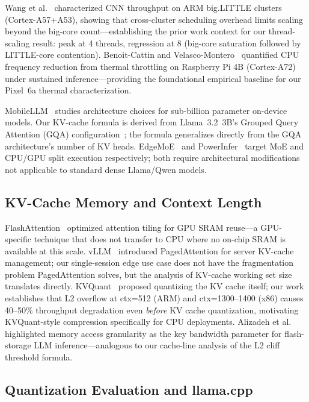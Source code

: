 \documentclass[conference]{IEEEtran}
\begin{document}
Wang et al.~\cite{wang_biglittle} characterized CNN throughput on ARM big.LITTLE
clusters (Cortex-A57+A53), showing that cross-cluster scheduling overhead limits
scaling beyond the big-core count---establishing the prior work context for our
thread-scaling result: peak at 4 threads, regression at 8 (big-core saturation
followed by LITTLE-core contention).
Benoit-Cattin and Velasco-Montero~\cite{benoit_thermal} quantified CPU frequency
reduction from thermal throttling on Raspberry Pi 4B (Cortex-A72) under sustained
inference---providing the foundational empirical baseline for our Pixel~6a
thermal characterization.

MobileLLM~\cite{mobilellm} studies architecture choices for sub-billion parameter
on-device models. Our KV-cache formula is derived from Llama~3.2~3B's Grouped
Query Attention (GQA) configuration~\cite{llama32,gqa}; the formula generalizes
directly from the GQA architecture's number of KV heads.
EdgeMoE~\cite{edgeMoE} and PowerInfer~\cite{powerinfer} target MoE and CPU/GPU split
execution respectively; both require architectural modifications not applicable to
standard dense Llama/Qwen models.

\subsection{KV-Cache Memory and Context Length}

FlashAttention~\cite{flashattention,flashattention2} optimized attention tiling
for GPU SRAM reuse---a GPU-specific technique that does not transfer to CPU where
no on-chip SRAM is available at this scale.
vLLM~\cite{vllm} introduced PagedAttention for server KV-cache management;
our single-session edge use case does not have the fragmentation problem PagedAttention
solves, but the analysis of KV-cache working set size translates directly.
KVQuant~\cite{kvquant} proposed quantizing the KV cache itself; our work establishes
that L2 overflow at ctx=512 (ARM) and ctx=1300--1400 (x86) causes 40--50\% throughput
degradation even \emph{before} KV cache quantization, motivating KVQuant-style compression
specifically for CPU deployments.
Alizadeh et al.~\cite{llm_flash} highlighted memory access granularity as the key
bandwidth parameter for flash-storage LLM inference---analogous to our cache-line
analysis of the L2 cliff threshold formula.

\subsection{Quantization Evaluation and llama.cpp}
\end{document}
